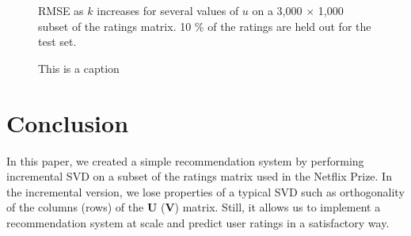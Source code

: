 \documentclass{article} %
\begin{document}
\begin{figure}[H]
\begin{center}
\end{center}
\caption{RMSE as $k$ increases for several values of $u$ on a 3,000 $\times$ 1,000 subset of the ratings matrix. 10 \% of the ratings are held out for the test set.}
\label{fig:error_small}
\end{figure}

\begin{figure}[H]
\begin{center}
\end{center}
\caption{This is a caption}
\label{fig:ortho_small}
\end{figure}

\section{Conclusion}
In this paper, we created a simple recommendation system by performing incremental SVD on a subset of the ratings matrix used in the Netflix Prize.
In the incremental version, we lose properties of a typical SVD such as orthogonality of the columns (rows) of the $\mathbf{U}$ ($\mathbf{V}$) matrix.
Still, it allows us to implement a recommendation system at scale and predict user ratings in a satisfactory way.




\end{document}
